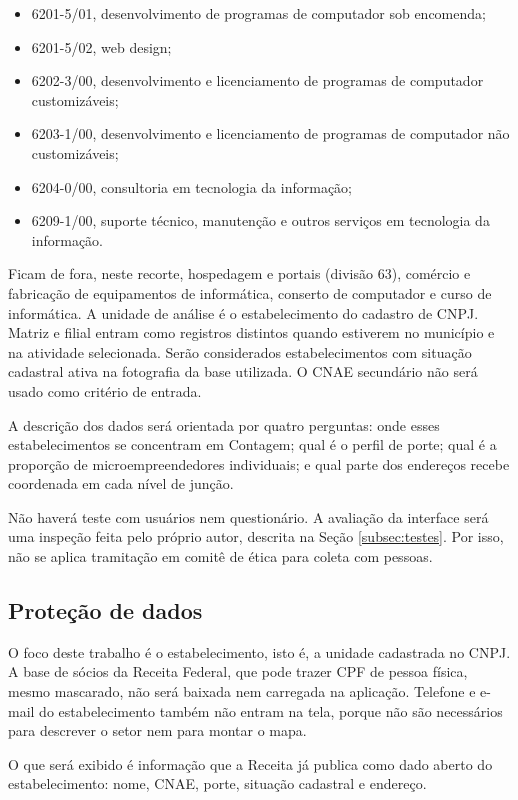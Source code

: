 \begin{itemize}
    \item 6201-5/01, desenvolvimento de programas de computador sob encomenda;
    \item 6201-5/02, web design;
    \item 6202-3/00, desenvolvimento e licenciamento de programas de computador customizáveis;
    \item 6203-1/00, desenvolvimento e licenciamento de programas de computador não customizáveis;
    \item 6204-0/00, consultoria em tecnologia da informação;
    \item 6209-1/00, suporte técnico, manutenção e outros serviços em tecnologia da informação.
\end{itemize}

Ficam de fora, neste recorte, hospedagem e portais (divisão 63), comércio e fabricação de equipamentos de informática, conserto de computador e curso de informática.
A unidade de análise é o estabelecimento do cadastro de CNPJ.
Matriz e filial entram como registros distintos quando estiverem no município e na atividade selecionada.
Serão considerados estabelecimentos com situação cadastral ativa na fotografia da base utilizada.
O CNAE secundário não será usado como critério de entrada.

A descrição dos dados será orientada por quatro perguntas: onde esses estabelecimentos se concentram em Contagem; qual é o perfil de porte; qual é a proporção de microempreendedores individuais; e qual parte dos endereços recebe coordenada em cada nível de junção.

Não haverá teste com usuários nem questionário.
A avaliação da interface será uma inspeção feita pelo próprio autor, descrita na Seção \ref{subsec:testes}.
Por isso, não se aplica tramitação em comitê de ética para coleta com pessoas.

\subsection{Proteção de dados}

O foco deste trabalho é o estabelecimento, isto é, a unidade cadastrada no CNPJ.
A base de sócios da Receita Federal, que pode trazer CPF de pessoa física, mesmo mascarado, não será baixada nem carregada na aplicação.
Telefone e e-mail do estabelecimento também não entram na tela, porque não são necessários para descrever o setor nem para montar o mapa.

O que será exibido é informação que a Receita já publica como dado aberto do estabelecimento: nome, CNAE, porte, situação cadastral e endereço.

